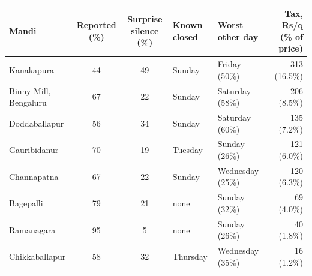\renewcommand{\arraystretch}{1.25}
\footnotesize
\begin{tabular}{|l|c|c|l|l|r|}
\hline
\textbf{Mandi} & \textbf{Reported (\%)} & \textbf{Surprise silence (\%)} & \textbf{Known closed} & \textbf{Worst other day} & \textbf{Tax, Rs/q (\% of price)} \\
\hline
Kanakapura & 44 & 49 & Sunday & Friday (50\%) & 313 (16.5\%) \\
\hline
Binny Mill, Bengaluru & 67 & 22 & Sunday & Saturday (58\%) & 206 (8.5\%) \\
\hline
Doddaballapur & 56 & 34 & Sunday & Saturday (60\%) & 135 (7.2\%) \\
\hline
Gauribidanur & 70 & 19 & Tuesday & Sunday (26\%) & 121 (6.0\%) \\
\hline
Channapatna & 67 & 22 & Sunday & Wednesday (25\%) & 120 (6.3\%) \\
\hline
Bagepalli & 79 & 21 & none & Sunday (32\%) & 69 (4.0\%) \\
\hline
Ramanagara & 95 & 5 & none & Sunday (26\%) & 40 (1.8\%) \\
\hline
Chikkaballapur & 58 & 32 & Thursday & Wednesday (35\%) & 16 (1.2\%) \\
\hline
\end{tabular}
